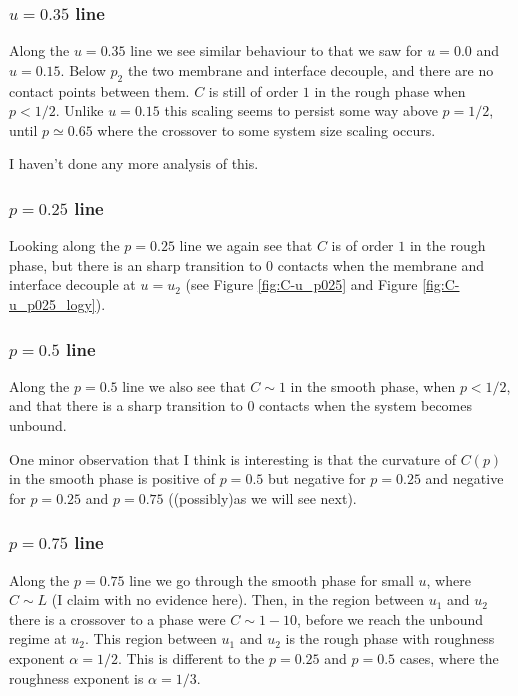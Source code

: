 \documentclass[a4paper,10pt]{article}
\newcommand{\fref}[1]{Figure \ref{#1}}
\begin{document}
\subsubsection{$u=0.35$ line}

Along the $u=0.35$ line we see similar behaviour to that we saw for $u=0.0$ and $u=0.15$. Below $p_2$ the two membrane and interface decouple, and there are no contact points between them. $C$ is still of order $1$ in the rough phase when $p< 1/2$. Unlike  $u=0.15$ this scaling seems to persist some way above $p=1/2$, until $p \simeq0.65$ where the crossover to some system size scaling occurs. 

I haven't done any more analysis of this.

\subsubsection{$p=0.25$ line}

Looking along the $p=0.25$ line we again see that $C$ is of order $1$ in the rough phase, but there is an sharp transition to $0$ contacts when the membrane and interface decouple at $u=u_2$ (see \fref{fig:C-u_p025} and \fref{fig:C-u_p025_logy}).

\subsubsection{$p=0.5$ line}

Along the $p=0.5$ line we also see that $C \sim 1$ in the smooth phase, when $p < 1/2$, and that there is a sharp transition to $0$ contacts when the system becomes unbound.

One minor observation that I think is interesting is that the curvature of $C(p)$ in the smooth phase is positive of $p=0.5$ but negative for $p =0.25$ and negative for $p = 0.25$ and $p=0.75$ ((possibly)as we will see next).

\subsubsection{$p=0.75$ line}

Along the $p = 0.75$ line we go through the smooth phase for small $u$, where $C \sim L$ (I claim with no evidence here). Then, in the region between $u_1$ and $u_2$ there is a crossover to a phase were $C \sim 1 - 10$, before we reach the unbound regime at $u_2$. This region between $u_1$ and $u_2$ is the rough phase with roughness exponent $\alpha = 1/2$. This is different to the $p=0.25$ and $p=0.5$ cases, where the roughness exponent is $\alpha = 1/3$.
\end{document}
